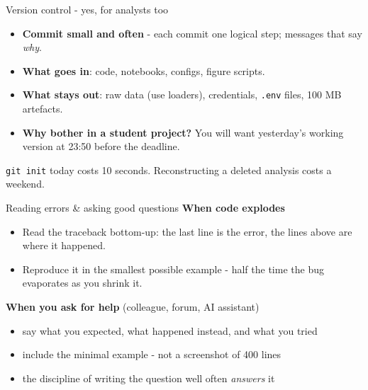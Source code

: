 \documentclass[10pt,aspectratio=169]{beamer}
\begin{document}
\begin{frame}{Version control - yes, for analysts too}
  \begin{itemize}
    \item \textbf{Commit small and often} - each commit one logical step;
          messages that say \emph{why}.
    \item \textbf{What goes in}: code, notebooks, configs, figure scripts.
    \item \textbf{What stays out}: raw data (use loaders), credentials,
          \texttt{.env} files, 100 MB artefacts.
    \item \textbf{Why bother in a student project?} You will want yesterday's
          working version at 23:50 before the deadline.
  \end{itemize}
  \vspace{0.6em}
  \begin{center}\small
    \texttt{git init} today costs 10 seconds. Reconstructing a deleted
    analysis costs a weekend.
  \end{center}
\end{frame}

\begin{frame}{Reading errors \& asking good questions}
  \textbf{When code explodes}
  \begin{itemize}\small
    \item Read the traceback \alert{bottom-up}: the last line is the error,
          the lines above are where it happened.
    \item Reproduce it in the smallest possible example - half the time the
          bug evaporates as you shrink it.
  \end{itemize}
  \vspace{0.5em}
  \textbf{When you ask for help} (colleague, forum, AI assistant)
  \begin{itemize}\small
    \item say what you expected, what happened instead, and what you tried
    \item include the minimal example - not a screenshot of 400 lines
    \item the discipline of writing the question well often \emph{answers} it
  \end{itemize}
\end{frame}
\end{document}
